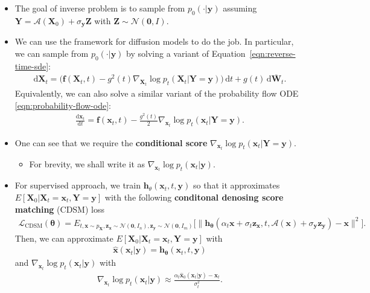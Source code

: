 \documentclass[10pt]{article}
\newcommand{\dee}{\mathrm{d}}
\newcommand{\ve}[1]{\mathbf{#1}}
\newcommand{\ves}[1]{\boldsymbol{#1}}
\newcommand{\mrm}[1]{\mathrm{#1}}
\newcommand{\mcal}[1]{\mathcal{#1}}
\begin{document}
\begin{itemize}
  \item The goal of inverse problem is to sample from $p_0(\cdot|\ve{y})$ assuming $\ve{Y} = \mcal{A}(\ve{X}_0) + \sigma_{\ve{y}}\ve{Z}$ with $\ve{Z} \sim \mcal{N}(\ve{0},I)$.
  
  \item We can use the framework for diffusion models to do the job. In particular, we can sample from $p_0(\cdot|\ve{y})$ by solving a variant of Equation~\ref{eqn:reverse-time-sde}:
  \begin{align*}
    \dee \ve{X}_t = \Big( \ve{f}(\ve{X}_t, t) - g^2(t) \nabla_{\ve{X}_t} \log p_t(\ve{X}_t|\ve{Y}=\ve{y}) \Big)\, \dee t + g(t)\, \dee \overline{\ve{W}}_t.
  \end{align*}
  Equivalently, we can also solve a similar variant of the probability flow ODE \eqref{eqn:probability-flow-ode}:
  \begin{align}
    \frac{\dee \ve{x}_t}{\dee t} = \ve{f}(\ve{x}_t, t) - \frac{g^2(t)}{2} \nabla_{\ve{x}_t} \log p_t(\ve{x}_t|\ve{Y}=\ve{y}).
  \end{align}

  \item One can see that we require the \textbf{conditional score} $\nabla_{\ve{x}_t} \log p_t(\ve{x}_t|\ve{Y}=\ve{y})$.
  \begin{itemize}
    \item For brevity, we shall write it as $\nabla_{\ve{x}_t} \log p_t(\ve{x}_t|\ve{y})$.
  \end{itemize}

  \item For supervised approach, we train $\ve{h}_{\theta}(\ve{x}_t, t, \ve{y})$ so that it approximates $E[\ve{X}_0 | \ve{X}_t = \ve{x}_t, \ve{Y} = \ve{y}]$ with the following \textbf{conditonal denosing score matching} (CDSM) loss
  \begin{align*}
    \mcal{L}_{\mrm{CDSM}}(\ves{\theta}) = E_{t, \ve{x} \sim p_{\ve{X}}, \ve{z}_{\ve{x}} \sim \mcal{N}(\ve{0}, I_n), \ve{z}_{\ve{y}} \sim \mcal{N}(\ve{0}, I_m) } \Big[ \big\| \ve{h}_{\ves{\theta}}(\alpha_t \ve{x} + \sigma_t \ve{z}_{\ve{x}}, t, \mcal{A}(\ve{x}) + \sigma_{\ve{y}}\ve{z}_{\ve{y}} ) - \ve{x} \big\|^2 \Big].
  \end{align*}
  Then, we can approximate $E[\ve{X}_0 | \ve{X}_t = \ve{x}_t, \ve{Y} = \ve{y}]$ with 
  \begin{align*}
    \hat{\ve{x}}(\ve{x}_t|\ve{y}) = \ve{h}_{\ves{\theta}}(\ve{x}_t, t, \ve{y})
  \end{align*}
  and $\nabla_{\ve{x}_t} \log p_t(\ve{x}_t|\ve{y})$ with
  \begin{align*}
    \nabla_{\ve{x}_t} \log p_t(\ve{x}_t|\ve{y}) \approx \frac{\alpha_t \hat{\ve{x}}_0(\ve{x}_t|\ve{y}) - \ve{x}_t}{\sigma_t^2}.
  \end{align*}


\end{itemize}
\end{document}
